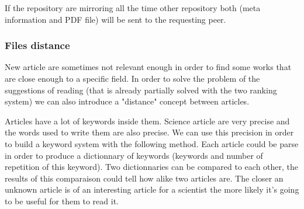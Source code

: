 If the repository are mirroring all the time other repository both (meta information and
PDF file) will be sent to the requesting peer.

\subsubsection{Files distance}

New article are sometimes not relevant enough in order to find some works that are
close enough to a specific field. In order to solve the problem of the suggestions of
reading (that is already partially solved with the two ranking system) we can also
introduce a "distance" concept between articles.

Articles have a lot of keywords inside them. Science article are very precise and 
the words used to write them are also precise. We can use this precision in order to build a 
keyword system with the following method. Each article could be parse in order to produce 
a dictionnary of keywords (keywords and number of repetition of this keyword). Two 
dictionnaries can be compared to each other, the results of this comparaison could tell
how alike two articles are. The closer an unknown article is of an interesting article for a scientist
the more likely it's going to be useful for them to read it.
